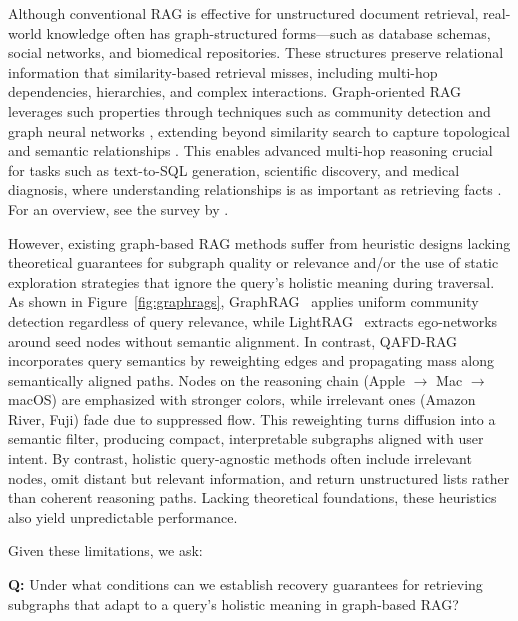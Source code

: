 \documentclass{article} %
\begin{document}
Although conventional RAG is effective for unstructured document retrieval, real-world knowledge often has graph-structured forms—such as database schemas, social networks, and biomedical repositories. These structures preserve relational information that similarity-based retrieval misses, including multi-hop dependencies, hierarchies, and complex interactions. Graph-oriented RAG leverages such properties through techniques such as community detection and graph neural networks \citep{edge2024local,wang2024knowledge}, extending beyond similarity search to capture topological and semantic relationships \citep{fan2024survey,gao2023retrieval}. This enables advanced multi-hop reasoning crucial for tasks such as text-to-SQL generation, scientific discovery, and medical diagnosis, where understanding relationships is as important as retrieving facts \citep{chen2025graph,wigh2022review,zhang2024tree}. For an overview, see the survey by \citet{han2024retrieval}.




However, existing graph-based RAG methods \citep{han2024retrieval} {suffer from heuristic designs lacking theoretical guarantees for subgraph quality or relevance and/or the use of static exploration strategies that ignore the query's holistic meaning during traversal}. As shown in Figure~\ref{fig:graphrags}, GraphRAG~\citep{edge2024local} applies uniform community detection regardless of query relevance, while LightRAG~\citep{guo2024lightrag} extracts ego-networks around seed nodes without semantic alignment.  In contrast, QAFD-RAG incorporates query semantics by reweighting edges and propagating mass along semantically aligned paths. Nodes on the reasoning chain (Apple $\rightarrow$ Mac $\rightarrow$ macOS) are emphasized with stronger colors, while irrelevant ones (Amazon River, Fuji) fade due to suppressed flow. This reweighting turns diffusion into a semantic filter, producing compact, interpretable subgraphs aligned with user intent. By contrast, holistic query-agnostic methods often include irrelevant nodes, omit distant but relevant information, and return unstructured lists rather than coherent reasoning paths. Lacking theoretical foundations, these heuristics also yield unpredictable performance.


Given these limitations, we ask:
\begin{center}
\begin{tcolorbox}[
    enhanced,
    colback=gray!8,
    colframe=blue!65,
    boxrule=0.6pt,
    leftrule=4pt,
    arc=2pt,
    left=2pt,
    right=3pt,
    top=3pt,
    bottom=3pt,
    fontupper=\itshape,
    before skip=2pt,
    after skip=2pt,
    width=0.79\textwidth
]
\textcolor{gray!75}{\textbf{Q:}} Under what conditions can we establish recovery guarantees for retrieving subgraphs that adapt to a query’s holistic meaning in graph-based RAG?
\end{tcolorbox}
\end{center}
\end{document}

